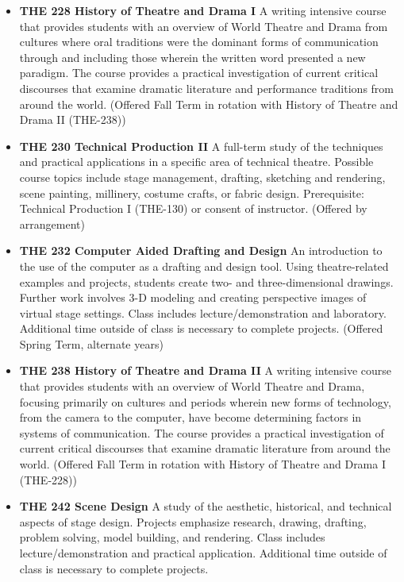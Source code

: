 \documentclass[
  letterpaper,
]{scrbook}
\begin{document}
\begin{itemize}
\item
  \textbf{THE 228 History of Theatre and Drama I} A writing intensive
  course that provides students with an overview of World Theatre and
  Drama from cultures where oral traditions were the dominant forms of
  communication through and including those wherein the written word
  presented a new paradigm. The course provides a practical
  investigation of current critical discourses that examine dramatic
  literature and performance traditions from around the world. (Offered
  Fall Term in rotation with History of Theatre and Drama II (THE-238))
\item
  \textbf{THE 230 Technical Production II} A full-term study of the
  techniques and practical applications in a specific area of technical
  theatre. Possible course topics include stage management, drafting,
  sketching and rendering, scene painting, millinery, costume crafts, or
  fabric design. Prerequisite: Technical Production I (THE-130) or
  consent of instructor. (Offered by arrangement)\\
\item
  \textbf{THE 232 Computer Aided Drafting and Design} An introduction to
  the use of the computer as a drafting and design tool. Using
  theatre-related examples and projects, students create two- and
  three-dimensional drawings. Further work involves 3-D modeling and
  creating perspective images of virtual stage settings. Class includes
  lecture/demonstration and laboratory. Additional time outside of class
  is necessary to complete projects. (Offered Spring Term, alternate
  years)
\item
  \textbf{THE 238 History of Theatre and Drama II} A writing intensive
  course that provides students with an overview of World Theatre and
  Drama, focusing primarily on cultures and periods wherein new forms of
  technology, from the camera to the computer, have become determining
  factors in systems of communication. The course provides a practical
  investigation of current critical discourses that examine dramatic
  literature from around the world. (Offered Fall Term in rotation with
  History of Theatre and Drama I (THE-228))\\
\item
  \textbf{THE 242 Scene Design} A study of the aesthetic, historical,
  and technical aspects of stage design. Projects emphasize research,
  drawing, drafting, problem solving, model building, and rendering.
  Class includes lecture/demonstration and practical application.
  Additional time outside of class is necessary to complete projects.

\end{itemize}
\end{document}
